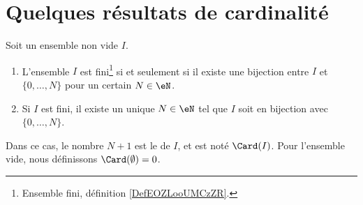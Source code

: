 
\section{Quelques résultats de cardinalité}
\label{SECooResultatsCardinalite}

\begin{propositionDef}     \label{PROPooJLGKooDCcnWi}
	Soit un ensemble non vide \( I\).
	\begin{enumerate}
		\item   \label{ITEMooMNMTooEOIjdo}
		      L'ensemble \( I\) est fini\footnote{Ensemble fini, définition \ref{DefEOZLooUMCzZR}.} si et seulement si il existe une bijection entre \( I\) et \( \{ 0,\ldots, N \}\) pour un certain \( N\in \eN\).
		\item   \label{ITEMooZJFUooSNUSIk}
		      Si \( I\) est fini, il existe un unique \( N\in \eN\) tel que \( I\) soit en bijection avec \( \{ 0,\ldots, N \}\).
	\end{enumerate}
	Dans ce cas, le nombre \( N+1\) est le  de \( I\), et est noté \( \Card(I)\). Pour l'ensemble vide, nous définissons \( \Card(\emptyset)=0\).
\end{propositionDef}

